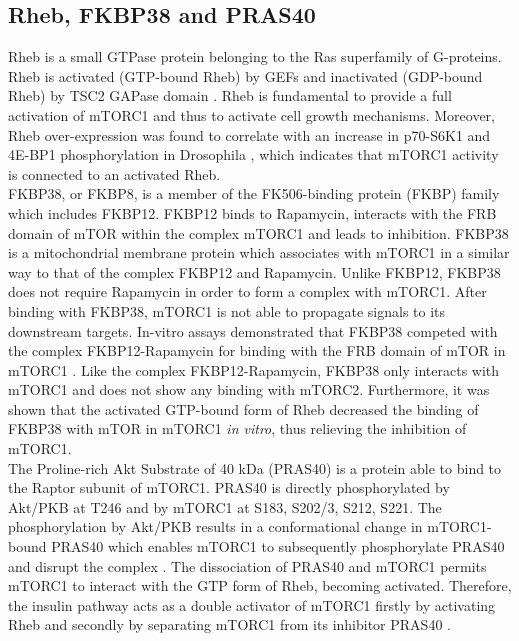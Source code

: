 \subsection{Rheb, FKBP38 and PRAS40}
\label{subsec:Rheb, FKBP38 and PRAS40}
Rheb is a small GTPase protein belonging to the Ras superfamily of G-proteins. Rheb is activated (GTP-bound Rheb) by GEFs and inactivated (GDP-bound Rheb) by TSC2 GAPase domain \citep{Huang2008review}. Rheb is fundamental to provide a full activation of mTORC1 and thus to activate cell growth mechanisms. Moreover, Rheb over-expression was found to correlate with an increase in p70-S6K1 and 4E-BP1 phosphorylation in Drosophila \citep{Stocker2003}, which indicates that mTORC1 activity is connected to an activated Rheb.\\
FKBP38, or FKBP8, is a member of the FK506-binding protein (FKBP) family which includes FKBP12. FKBP12 binds to Rapamycin, interacts with the FRB domain of mTOR within the complex mTORC1 and leads to inhibition. FKBP38 is a mitochondrial membrane protein which associates with mTORC1 in a similar way to that of the complex FKBP12 and Rapamycin. Unlike FKBP12, FKBP38 does not require Rapamycin in order to form a complex with mTORC1. After binding with FKBP38, mTORC1 is not able to propagate signals to its downstream targets. In-vitro assays demonstrated that FKBP38 competed with the complex FKBP12-Rapamycin for binding with the FRB domain of mTOR in mTORC1 \citep{Bai2007}. Like the complex FKBP12-Rapamycin, FKBP38 only interacts with mTORC1 and does not show any binding with mTORC2. Furthermore, it was shown that the activated GTP-bound form of Rheb decreased the binding of FKBP38 with mTOR in mTORC1 \emph{in vitro}, thus relieving the inhibition of mTORC1.\\
The Proline-rich Akt Substrate of 40 kDa (PRAS40) is a protein able to bind to the Raptor subunit of mTORC1. PRAS40 is directly phosphorylated by Akt/PKB at T246 and by mTORC1 at S183, S202/3, S212, S221. The phosphorylation by Akt/PKB results in a conformational change in mTORC1-bound PRAS40 which enables mTORC1 to subsequently phosphorylate PRAS40 and disrupt the complex \citep{Lawrence2007, Thedieck2007, Nascimento2009, Nascimento2010}. The dissociation of PRAS40 and mTORC1 permits mTORC1 to interact with the GTP form of Rheb, becoming activated. Therefore, the insulin pathway acts as a double activator of mTORC1 firstly by activating Rheb and secondly by separating mTORC1 from its inhibitor PRAS40 \citep{Lawrence2007, Thedieck2007, Thedieck2009}.

